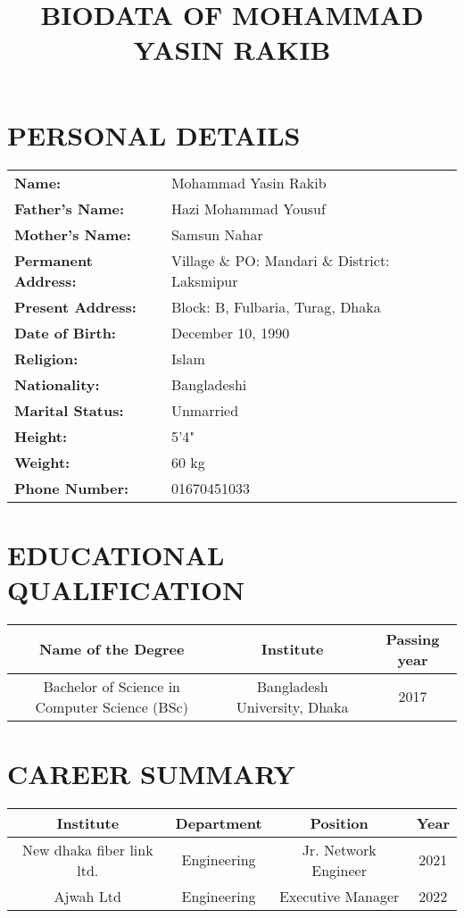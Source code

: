 \documentclass{article}
\begin{document}
\title{BIODATA OF MOHAMMAD YASIN RAKIB}
\date{}
\maketitle

\section*{PERSONAL DETAILS}
\begin{tabular}{@{}l@{\hspace{1cm}}p{8cm}@{}}
    \textbf{Name:} & Mohammad Yasin Rakib \\
    \textbf{Father's Name:} & Hazi Mohammad Yousuf \\
    \textbf{Mother's Name:} & Samsun Nahar \\
    \textbf{Permanent Address:} & Village \& PO: Mandari \& District: Laksmipur \\
    \textbf{Present Address:} & Block: B, Fulbaria, Turag, Dhaka \\
    \textbf{Date of Birth:} & December 10, 1990 \\
    \textbf{Religion:} & Islam \\
    \textbf{Nationality:} & Bangladeshi \\
    \textbf{Marital Status:} & Unmarried \\
    \textbf{Height:} & 5'4" \\
    \textbf{Weight:} & 60 kg \\
    \textbf{Phone Number:} & 01670451033 \\
\end{tabular}


\section*{EDUCATIONAL QUALIFICATION}
\begin{tabular}{|c|c|c|}
    \hline
    \textbf{Name of the Degree} & \textbf{Institute} & \textbf{Passing year} \\
    \hline
    Bachelor of Science in Computer Science (BSc) & Bangladesh University, Dhaka & 2017 \\
    \hline
\end{tabular}

\section*{CAREER SUMMARY}
\begin{tabular}{|c|c|c|c|}
    \hline
    \textbf{Institute} & \textbf{Department} & \textbf{Position} & \textbf{Year} \\
    \hline
    New dhaka fiber link ltd. & Engineering & Jr. Network Engineer & 2021 \\
    \hline
    Ajwah Ltd & Engineering & Executive Manager & 2022 \\
    \hline
\end{tabular}
\end{document}

